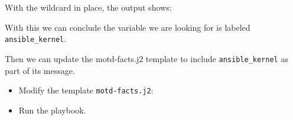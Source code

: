 With the wildcard in place, the output shows:

\begin{Shaded}
\begin{Highlighting}[]

 \PreprocessorTok{[}\PreprocessorTok{]} \PreprocessorTok{*******************************************************************}
 \PreprocessorTok{[}\PreprocessorTok{]}\NormalTok{ =}\OperatorTok{\textgreater{}}\NormalTok{ \{}
    \ExtensionTok{:}\NormalTok{ \{}
        \ExtensionTok{:}\NormalTok{ \{}
            \ExtensionTok{:} 
        \ErrorTok{\}}\ExtensionTok{,}
        \ExtensionTok{:}
        \ExtensionTok{:}
    \ErrorTok{\}}
\ErrorTok{\}}
\end{Highlighting}
\end{Shaded}

With this we can conclude the variable we are looking for is labeled
\texttt{ansible\_kernel}.

Then we can update the motd-facts.j2 template to include
\texttt{ansible\_kernel} as part of its message.

\begin{itemize}
\tightlist
\item
  Modify the template \texttt{motd-facts.j2}:
\end{itemize}

\begin{Shaded}
\begin{Highlighting}[]
\end{Highlighting}
\end{Shaded}

\begin{itemize}
\tightlist
\item
  Run the playbook.
\end{itemize}

\begin{Shaded}
\begin{Highlighting}[]
\ExtensionTok{[student@controller}\NormalTok{ \textasciitilde{}]$ ansible{-}navigator run motd{-}facts.yml }
\end{Highlighting}
\end{Shaded}

